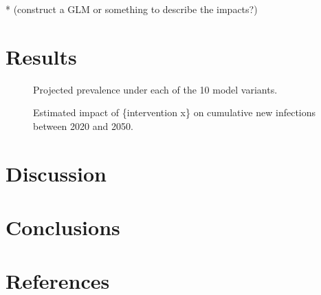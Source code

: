 \documentclass{article}
\numberwithin{equation}{section}
\begin{document}
* (construct a GLM or something to describe the impacts?)
\section{Results}\label{s:results}

\begin{figure}
  \centering\scalebox{6}{$\times$}
  \caption{Projected prevalence under each of the 10 model variants.}
\end{figure}
\begin{figure}
  \centering\scalebox{6}{$\times$}
  \caption{Estimated impact of \{intervention x\} on cumulative new infections between 2020 and 2050.}
\end{figure}
\section{Discussion}\label{s:discussion}
\section{Conclusions}\label{s:conclusion}
\section{References}\label{s:references}
\printbibliography[heading=none]
\end{document}

